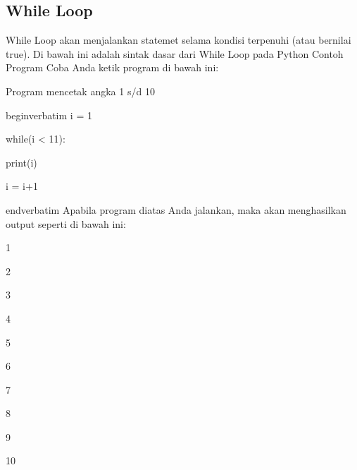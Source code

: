 \subsection{While Loop}
While Loop akan menjalankan statemet selama kondisi terpenuhi (atau bernilai true).\vspace{\baselineskip}
\vspace{\baselineskip}
Di bawah ini adalah sintak dasar dari While Loop pada Python\vspace{\baselineskip}
\vspace{\baselineskip}
Contoh Program\vspace{\baselineskip}
\vspace{\baselineskip}
Coba Anda ketik program di bawah ini:\vspace{\baselineskip}
\vspace{\baselineskip}
 \par
Program mencetak angka 1 s/d 10 \par
\vspace{12pt}
begin{verbatim}
i = 1 \par
while(i < 11): \par
 print(i) \par
 i = i+1 \par
 end{verbatim}
\vspace{\baselineskip}
Apabila program diatas Anda jalankan, maka akan menghasilkan output seperti di bawah ini:\vspace{\baselineskip}
\vspace{\baselineskip}
 \par
1 \par
2 \par
3 \par
4 \par
5 \par
6 \par
7 \par
8 \par
9 \par
10 \par
\vspace{12pt}
\vspace{\baselineskip}
\vspace{12pt}
